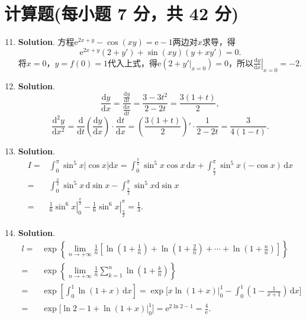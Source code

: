 \documentclass[../main.tex]{subfiles}
\begin{document}
\section{计算题(每小题 7 分，共 42 分)}
\begin{enumerate}
    \setcounter{enumi}{10}
    \item \textbf{Solution}. 方程$\mathrm{e}^{2x+y}-\cos(xy)=\mathrm{e}-1$两边对$x$求导，得
          \[
              \mathrm{e}^{2x+y}(2+y')+\sin(xy)(y+xy')=0.
          \]
          将$x=0$，$y=f(0)=1$代入上式，得$\mathrm{e}(2+\left.y'\right|_{x=0})=0$，所以$\left
              .\frac{\mathrm{d}y}{\mathrm{d}x}\right|_{x=0}=-2$.

    \item \textbf{Solution}.
          \[
              \frac{\mathrm{d}y}{\mathrm{d}x}=\frac{\frac{\mathrm{d}y}{\mathrm{d}t}}{\frac{\mathrm{d}x}{\mathrm{d}t}}
              =\frac{3-3t^{2}}{2-2t}=\frac{3(1+t)}{2},
          \]
          \[
              \frac{\mathrm{d}^{2}y}{\mathrm{d}x^{2}}=\frac{\mathrm{d}}{\mathrm{d}t}\left
              (\frac{\mathrm{d}y}{\mathrm{d}x}\right)\cdot\frac{\mathrm{d}t}{\mathrm{d}x}
              =\left(\frac{3(1+t)}{2}\right)'\cdot\frac{1}{2-2t}=\frac{3}{4(1-t)}.
          \]

    \item \textbf{Solution}.
          \[
              \begin{aligned}
                  I = {} & \int_{0}^{\pi}\sin^{5} x|\cos x|\mathrm{d}x = \int_{0}^{\frac{\pi}{2}}\sin^{5} x\cos x\,\mathrm{d}x + \int_{\frac{\pi}{2}}^{\pi}\sin^{5} x(-\cos x)\,\mathrm{d}x \\
                  = {}   & \int_{0}^{\frac{\pi}{2}}\sin^{5} x\,\mathrm{d}\sin x - \int_{\frac{\pi}{2}}^{\pi}\sin^{5} x \mathrm{d}\sin x                                                     \\
                  = {}   & \left.\frac{1}{6}\sin^{6} x\right|_{0}^{\frac{\pi}{2}}- \left.\frac{1}{6}\sin^{6} x\right|_{\frac{\pi}{2}}^{\pi}= \frac{1}{3}.
              \end{aligned}
          \]

    \item \textbf{Solution}.
          \[
              \begin{aligned}
                  l = {} & \exp\left\{\lim_{n\to+\infty}\frac{1}{n}\left[\ln\left(1+\frac{1}{n}\right)+\ln\left(1+\frac{2}{n}\right)+\cdots+\ln\left(1+\frac{n}{n}\right)\right]\right\} \\
                  = {}   & \exp\left\{\lim_{n\to+\infty}\frac{1}{n}\sum_{k=1}^{n}\ln\left(1+\frac{k}{n}\right)\right\}                                                                   \\
                  = {}   & \exp\left[\int_{0}^{1}\ln(1+x)\,\mathrm{d}x\right] = \exp\Bigg[x\ln(1+x)\Bigg|_{0}^{1}-\int_{0}^{1}\left(1-\frac{1}{x+1}\right)\,\mathrm{d}x\Bigg]            \\
                  = {}   & \exp\Bigg[\ln 2 - 1 +\ln(1+x)\Bigg|_{0}^{1}\Bigg] = \mathrm{e}^{2\ln 2-1}=\frac{4}{\mathrm{e}}.
              \end{aligned}
          \]


\end{enumerate}
\end{document}
